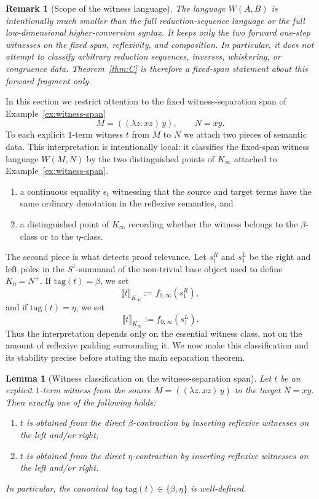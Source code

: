\documentclass[webpdf,traditional,large,numbered]{oup-authoring-template}
\theoremstyle{thmstyleone}%
\newtheorem{lemma}[theorem]{Lemma}
\theoremstyle{thmstyletwo}%
\newtheorem{remark}[theorem]{Remark}
\theoremstyle{thmstylethree}%
\newcommand{\Kinf}{K_\infty}
\begin{document}
\begin{remark}[Scope of the witness language]\label{rem:witness-language-scope}
The language $W(A,B)$ is intentionally much smaller than the full
reduction-sequence language or the full low-dimensional higher-conversion
syntax.  It keeps only the two forward one-step witnesses on the fixed span,
reflexivity, and composition.  In particular, it does not attempt to classify
arbitrary reduction sequences, inverses, whiskering, or congruence data.
Theorem~\ref{thm:C} is therefore a fixed-span statement about this forward
fragment only.
\end{remark}

In this section we restrict attention to the fixed witness-separation span of
Example~\ref{ex:witness-span}
\[
  M=((\lambda z.\,xz)\,y),
  \qquad
  N=xy.
\]
To each explicit $1$-term witness $t$ from $M$ to $N$ we attach two pieces of
semantic data.  This interpretation is intentionally local: it classifies the
fixed-span witness language $W(M,N)$ by the two distinguished points of
$\Kinf$ attached to Example~\ref{ex:witness-span}.

\begin{enumerate}[label=(\arabic*), leftmargin=*, labelsep=0.6em]
  \item a continuous equality $\epsilon_t$ witnessing that the source and target
  terms have the same ordinary denotation in the reflexive semantics, and
  \item a distinguished point of $\Kinf$ recording whether the witness belongs
  to the $\beta$-class or to the $\eta$-class.
\end{enumerate}

The second piece is what detects proof relevance.  Let $s^R_1$ and $s^L_1$ be
the right and left poles in the $S^1$-summand of the non-trivial base object
used to define $K_0=N^+$.  If $\mathrm{tag}(t)=\beta$, we set
\[
  \llbracket t\rrbracket_{\Kinf}:=f_{0,\infty}(s^R_1),
\]
and if $\mathrm{tag}(t)=\eta$, we set
\[
  \llbracket t\rrbracket_{\Kinf}:=f_{0,\infty}(s^L_1).
\]
Thus the interpretation depends only on the essential witness class, not on the
amount of reflexive padding surrounding it.  We now make this classification and
its stability precise before stating the main separation theorem.

\begin{lemma}[Witness classification on the witness-separation span]\label{lem:witness-normal}
  Let $t$ be an explicit $1$-term witness from the source $M =
  ((\lambda z.\,xz)\,y)$ to the target $N = xy$.  Then exactly one of the
  following holds:
  \begin{enumerate}[label=(\alph*)]
    \item $t$ is obtained from the direct $\beta$-contraction by inserting
      reflexive witnesses on the left and/or right;
    \item $t$ is obtained from the direct $\eta$-contraction by inserting
      reflexive witnesses on the left and/or right.
  \end{enumerate}
  In particular, the canonical tag $\mathrm{tag}(t)\in\{\beta,\eta\}$ is
  well-defined.
\end{lemma}
\end{document}
